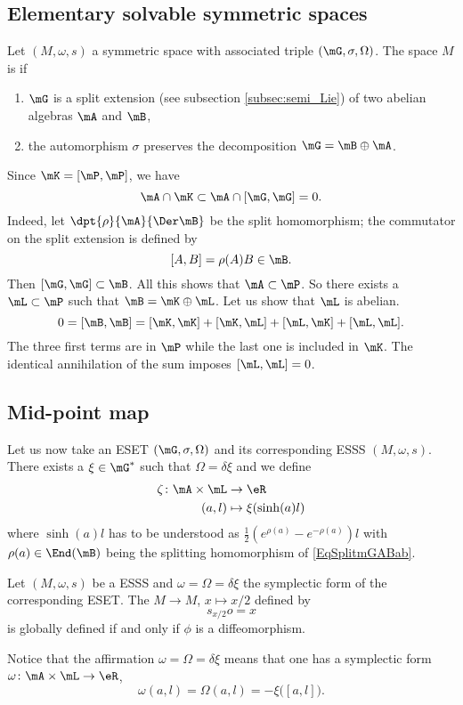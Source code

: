 \subsection{Elementary solvable symmetric spaces}

Let $(M,\omega,s)$ a symmetric space with associated triple $(\mG,\sigma,\Omega)$. The space $M$ is  if

\begin{enumerate}
\item $\mG$ is a split extension  (see subsection \ref{subsec:semi_Lie}) of two abelian algebras $\mA$ and $\mB$,
\item the automorphism $\sigma$ preserves the decomposition $\mG=\mB\oplus\mA$.
\end{enumerate}
Since $\mK=[\mP,\mP]$, we have
\[ 
  \mA\cap\mK\subset\mA\cap[\mG,\mG]=0.
\]
Indeed, let $\dpt{\rho}{\mA}{\Der\mB}$ be the split homomorphism; the commutator on the split extension is defined by
\[ 
  [A,B]=\rho(A)B\in\mB.
\]
Then $[\mG,\mG]\subset\mB$. All this shows that $\mA\subset\mP$. So there exists a $\mL\subset\mP$ such that $\mB=\mK\oplus\mL$. Let us show that $\mL$ is abelian.
\[ 
  0=[\mB,\mB]=[\mK,\mK]+[\mK,\mL]+[\mL,\mK]+[\mL,\mL].
\]
The three first terms are in $\mP$ while the last one is included in $\mK$. The identical annihilation of the sum imposes $[\mL,\mL]=0$.

\subsection{Mid-point map}

Let us now take an ESET $(\mG,\sigma,\Omega)$ and its corresponding ESSS $(M,\omega,s)$. There exists a $\xi\in\mG^*$ such that $\Omega=\delta\xi$ and we define
\begin{equation}
\begin{aligned}
 \zeta\colon \mA\times\mL&\to \eR \\ 
(a,l)&\mapsto \xi(\sinh(a)l) 
\end{aligned}
\end{equation}
where $\sinh(a)l$ has to be understood as $\frac{ 1 }{2}( e^{\rho(a)}- e^{-\rho(a)})l$ with $\rho(a)\in\End(\mB)$ being the splitting homomorphism of \eqref{EqSplitmGABab}. 
\begin{proposition}
Let $(M,\omega,s)$ be a ESSS and $\omega=\Omega=\delta\xi$ the symplectic form of the corresponding ESET. The  $M\to M$, $x\mapsto x/2$ defined by 
\[ 
  s_{x/2}o=x
\]
is globally defined if and only if $\phi$ is a diffeomorphism.
\end{proposition}
Notice that the affirmation $\omega=\Omega=\delta\xi$ means that one has a symplectic form $\omega\colon \mA\times\mL\to \eR$,
\[ 
  \omega(a,l)=\Omega(a,l)=-\xi\big( [a,l] \big).
\]


